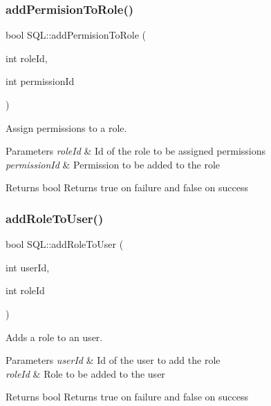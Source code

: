 \subsubsection{\texorpdfstring{add\+Permision\+To\+Role()}{addPermisionToRole()}}
{\footnotesize\ttfamily bool S\+Q\+L\+::add\+Permision\+To\+Role (\begin{DoxyParamCaption}\item[{int}]{role\+Id,  }\item[{int}]{permission\+Id }\end{DoxyParamCaption})}



Assign permissions to a role. 


\begin{DoxyParams}{Parameters}
{\em role\+Id} & Id of the role to be assigned permissions \\
\hline
{\em permission\+Id} & Permission to be added to the role \\
\hline
\end{DoxyParams}
\begin{DoxyReturn}{Returns}
{\ttfamily bool} Returns true on failure and false on success 
\end{DoxyReturn}
\mbox{\label{class_s_q_l_a3c6333842b20b930924e655f12a3dd66}} 
\subsubsection{\texorpdfstring{add\+Role\+To\+User()}{addRoleToUser()}}
{\footnotesize\ttfamily bool S\+Q\+L\+::add\+Role\+To\+User (\begin{DoxyParamCaption}\item[{int}]{user\+Id,  }\item[{int}]{role\+Id }\end{DoxyParamCaption})}



Adds a role to an user. 


\begin{DoxyParams}{Parameters}
{\em user\+Id} & Id of the user to add the role \\
\hline
{\em role\+Id} & Role to be added to the user \\
\hline
\end{DoxyParams}
\begin{DoxyReturn}{Returns}
{\ttfamily bool} Returns true on failure and false on success 
\end{DoxyReturn}
\mbox{\label{class_s_q_l_ad598892914c6cb227f30cf672427f572}} 
